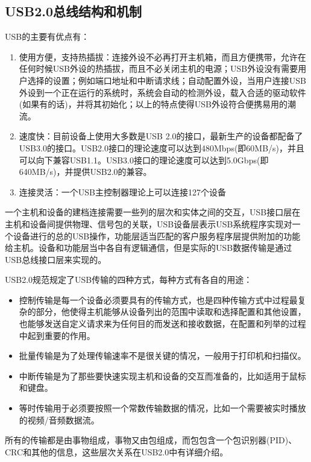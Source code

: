 \subsection{USB2.0总线结构和机制}
	USB的主要有优点有：
\begin{enumerate}
\item 使用方便，支持热插拔：连接外设不必再打开主机箱，而且方便携带，允许在任何时候USB外设的热插拔，而且不必关闭主机的电源；USB外设没有需要用户选择的设置；例如端口地址和中断请求线；自动配置外设，当用户连接USB外设到一个正在运行的系统时，系统会自动的检测外设，载入合适的驱动软件(如果有的话)，并将其初始化；以上的特点使得USB外设符合便携易用的潮流。
\item 速度快：目前设备上使用大多数是USB 2.0的接口，最新生产的设备都配备了USB3.0的接口。USB2.0接口的理论速度可以达到480Mbps(即60MB/s)，并且可以向下兼容USB1.1。USB3.0接口的理论速度可以达到5.0Gbps(即640MB/s)，并提供USB2.0的兼容。
\item 连接灵活：一个USB主控制器理论上可以连接127个设备
\end{enumerate}

	一个主机和设备的建档连接需要一些列的层次和实体之间的交互，USB接口层在主机和设备间提供物理、信号包的关联，USB设备层表示USB系统程序实现对一个设备进行的总的USB操作，功能层适当匹配的客户服务程序层提供附加的功能给主机。设备和功能层当中各自有逻辑通信，但是实际的USB数据传输是通过USB总线接口层来实现的\cite{USB开发手册}\cite{圈圈教你玩USB}。
	
	USB2.0规范规定了USB传输的四种方式，每种方式有各自的用途\cite{USB总线接口开发指南}：
\begin{itemize}
\item {}

	控制传输是每一个设备必须要具有的传输方式，也是四种传输方式中过程最复杂的部分，他使得主机能够从设备列出的范围中读取和选择配置和其他设置，也能够发送自定义请求来为任何目的而发送和接收数据，在配置和列举的过程中起到重要的作用。
\item {}
	
	批量传输是为了处理传输速率不是很关键的情况，一般用于打印机和扫描仪。
\item {}

	中断传输是为了那些要快速实现主机和设备的交互而准备的，比如适用于鼠标和键盘。
\item {}
	
	等时传输用于必须要按照一个常数传输数据的情况，比如一个需要被实时播放的视频/音频数据流。
\end{itemize}
所有的传输都是由事物组成，事物又由包组成，而包包含一个包识别器(PID)、CRC和其他的信息，这些层次关系在USB2.0中有详细介绍。


